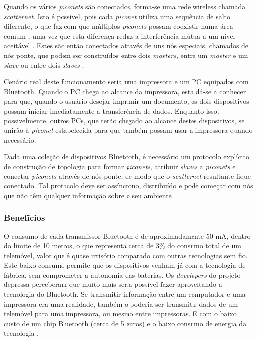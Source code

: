 \documentclass[conference]{IEEEtran}
\begin{document}
Quando os vários \textit{piconets} são conectados, forma-se uma rede wireless chamada \textit{scatternet}.
Isto é possível, pois cada \textit{piconet} utiliza uma sequência de salto diferente, o que faz com que múltiplos \textit{piconets} possam coexistir numa área comum \cite{salonidis2005distributed}, uma vez que esta diferença reduz a interferência mútua a um nível aceitável \cite{prasad2004ofdm}. 
Estes são então conectados através de uns nós especiais, chamados de nós ponte, que podem ser construídos entre dois \textit{masters}, entre um \textit{master} e um \textit{slave} ou entre dois \textit{slaves} \cite{salonidis2005distributed}.

Cenário real deste funcionamento seria uma impressora e um PC equipados com Bluetooth. Quando o PC chega ao alcance da impressora, esta dá-se a conhecer para que, quando o usuário desejar imprimir um documento, os dois dispositivos possam iniciar imediatamente a transferência de dados. Enquanto isso, possivelmente, outros PCs, que terão chegado ao alcance destes dispositivos, se unirão à \textit{piconet} estabelecida para que também possam usar a impressora quando necessário.

Dada uma coleção de dispositivos Bluetooth, é necessário um protocolo explícito de construção de topologia para formar \textit{piconets}, atribuir \textit{slaves} a \textit{piconets} e conectar \textit{piconets} através de nós ponte, de modo que o \textit{scatternet} resultante fique conectado. Tal protocolo deve ser assíncrono, distribuído e pode começar com nós que não têm qualquer informação sobre o seu ambiente \cite{salonidis2005distributed}. %


\subsubsection{Benefícios}

O consumo de cada transmissor Bluetooth é de aproximadamente 50 mA, dentro do limite de 10 metros, o que representa cerca de 3\% do consumo total de um telemóvel, valor que é quase irrisório comparado com outras tecnologias sem fio. 
Este baixo consumo permite que os dispositivos venham já com a tecnologia de fábrica, sem comprometer a autonomia das baterias. 
Os \textit{developers} do projeto depressa perceberam que muito mais seria possível fazer aproveitando a tecnologia do Bluetooth. 
Se transmitir informação entre um computador e uma impressora era uma realidade, também o poderia ser transmitir dados de um telemóvel para uma impressora, ou mesmo entre impressoras. 
E com o baixo custo de um chip Bluetooth (cerca de 5 euros) e o baixo consumo de energia da tecnologia \cite{kobayashi2004tecnologia}. 
\end{document}
